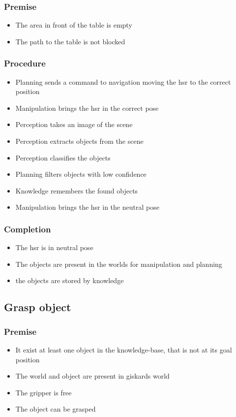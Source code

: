 \documentclass[main.tex]{subfiles}
\begin{document}
	\subsubsection{Premise}
	\begin{itemize}
		\item The area in front of the table is empty 
		\item The path to the table is not blocked
	\end{itemize} 
	
	\subsubsection{Procedure}
	\begin{itemize}			
		\item Planning sends a command to navigation moving the hsr to the correct position
		\item Manipulation brings the hsr in the correct pose
		\item Perception takes an image of the scene
		\item Perception extracts objects from the scene
		\item Perception classifies the objects	
		\item Planning filters objects with low confidence
		\item Knowledge remembers the found objects
		\item Manipulation brings the hsr in the neutral pose	 				
	\end{itemize}
	
	\subsubsection{Completion}
	\begin{itemize}
		\item The hsr is in neutral pose
		\item The objects are present in the worlds for manipulation and planning
		\item the objects are stored by knowledge				
	\end{itemize}
			
	\subsection{Grasp object}
	
	\subsubsection{Premise}
	\begin{itemize}
		\item It exist at least one object in the knowledge-base, that is not at its goal position
		\item The world and object are present in giskards world
		\item The gripper is free
		\item The object can be grasped 
	\end{itemize} 
	
\end{document}
